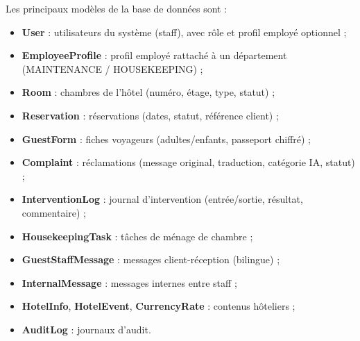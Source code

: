 


Les principaux modèles de la base de données sont :

\begin{itemize}
  \item \textbf{User} : utilisateurs du système (staff), avec rôle et profil employé optionnel ;
  \item \textbf{EmployeeProfile} : profil employé rattaché à un département (MAINTENANCE / HOUSEKEEPING) ;
  \item \textbf{Room} : chambres de l'hôtel (numéro, étage, type, statut) ;
  \item \textbf{Reservation} : réservations (dates, statut, référence client) ;
  \item \textbf{GuestForm} : fiches voyageurs (adultes/enfants, passeport chiffré) ;
  \item \textbf{Complaint} : réclamations (message original, traduction, catégorie IA, statut) ;
  \item \textbf{InterventionLog} : journal d'intervention (entrée/sortie, résultat, commentaire) ;
  \item \textbf{HousekeepingTask} : tâches de ménage de chambre ;
  \item \textbf{GuestStaffMessage} : messages client-réception (bilingue) ;
  \item \textbf{InternalMessage} : messages internes entre staff ;
  \item \textbf{HotelInfo}, \textbf{HotelEvent}, \textbf{CurrencyRate} : contenus hôteliers ;
  \item \textbf{AuditLog} : journaux d'audit.
\end{itemize}


